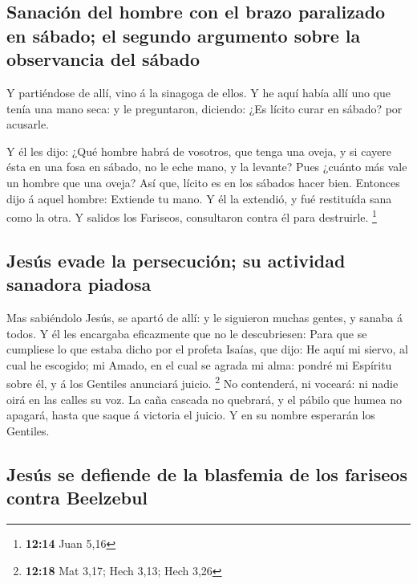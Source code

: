 \hypertarget{sanaciuxf3n-del-hombre-con-el-brazo-paralizado-en-suxe1bado-el-segundo-argumento-sobre-la-observancia-del-suxe1bado}{%
\subsection{Sanación del hombre con el brazo paralizado en sábado; el
segundo argumento sobre la observancia del
sábado}\label{sanaciuxf3n-del-hombre-con-el-brazo-paralizado-en-suxe1bado-el-segundo-argumento-sobre-la-observancia-del-suxe1bado}}

 Y partiéndose de allí, vino á la sinagoga de ellos.
 Y he aquí había allí uno que tenía una mano seca: y le
preguntaron, diciendo: ¿Es lícito curar en sábado? por acusarle.

 Y él les dijo: ¿Qué hombre habrá de vosotros, que tenga
una oveja, y si cayere ésta en una fosa en sábado, no le eche mano, y la
levante?  Pues ¿cuánto más vale un hombre que una oveja?
Así que, lícito es en los sábados hacer bien.  Entonces
dijo á aquel hombre: Extiende tu mano. Y él la extendió, y fué
restituída sana como la otra.  Y salidos los Fariseos,
consultaron contra él para destruirle. \footnote{\textbf{12:14} Juan
  5,16}

\hypertarget{jesuxfas-evade-la-persecuciuxf3n-su-actividad-sanadora-piadosa}{%
\subsection{Jesús evade la persecución; su actividad sanadora
piadosa}\label{jesuxfas-evade-la-persecuciuxf3n-su-actividad-sanadora-piadosa}}

 Mas sabiéndolo Jesús, se apartó de allí: y le siguieron
muchas gentes, y sanaba á todos.  Y él les encargaba
eficazmente que no le descubriesen:  Para que se
cumpliese lo que estaba dicho por el profeta Isaías, que dijo:
 He aquí mi siervo, al cual he escogido; mi Amado, en el
cual se agrada mi alma: pondré mi Espíritu sobre él, y á los Gentiles
anunciará juicio. \footnote{\textbf{12:18} Mat 3,17; Hech 3,13; Hech
  3,26}  No contenderá, ni voceará: ni nadie oirá en las
calles su voz.  La caña cascada no quebrará, y el pábilo
que humea no apagará, hasta que saque á victoria el juicio.
 Y en su nombre esperarán los Gentiles.

\hypertarget{jesuxfas-se-defiende-de-la-blasfemia-de-los-fariseos-contra-beelzebul}{%
\subsection{Jesús se defiende de la blasfemia de los fariseos contra
Beelzebul}\label{jesuxfas-se-defiende-de-la-blasfemia-de-los-fariseos-contra-beelzebul}}

